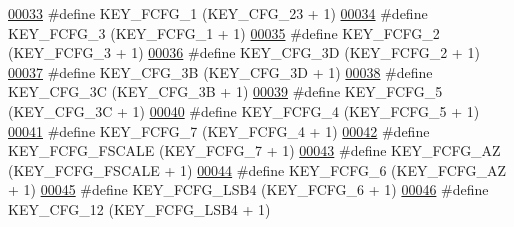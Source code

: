 \begin{DoxyCode}
\hypertarget{dmp_key_8h_source.tex_l00033}{}\hyperlink{dmp_key_8h_a9b1a7d7daa4fb73fb03dabaf6f4c97b9}{00033} \textcolor{preprocessor}{#define KEY\_FCFG\_1                  (KEY\_CFG\_23 + 1)}
\hypertarget{dmp_key_8h_source.tex_l00034}{}\hyperlink{dmp_key_8h_a2857c6fba1bb99df3e5f6da3e9b85a52}{00034} \textcolor{preprocessor}{#define KEY\_FCFG\_3                  (KEY\_FCFG\_1 + 1)}
\hypertarget{dmp_key_8h_source.tex_l00035}{}\hyperlink{dmp_key_8h_ac6bad3ac6c9d72158389154551e1bd45}{00035} \textcolor{preprocessor}{#define KEY\_FCFG\_2                  (KEY\_FCFG\_3 + 1)}
\hypertarget{dmp_key_8h_source.tex_l00036}{}\hyperlink{dmp_key_8h_a364597bae86eafc8fd74a851c1ad737c}{00036} \textcolor{preprocessor}{#define KEY\_CFG\_3D                  (KEY\_FCFG\_2 + 1)}
\hypertarget{dmp_key_8h_source.tex_l00037}{}\hyperlink{dmp_key_8h_a0e803abade5497b66f0f72a52dfa47b1}{00037} \textcolor{preprocessor}{#define KEY\_CFG\_3B                  (KEY\_CFG\_3D + 1)}
\hypertarget{dmp_key_8h_source.tex_l00038}{}\hyperlink{dmp_key_8h_af7e7b99c7694ffada093356f6f23dd0b}{00038} \textcolor{preprocessor}{#define KEY\_CFG\_3C                  (KEY\_CFG\_3B + 1)}
\hypertarget{dmp_key_8h_source.tex_l00039}{}\hyperlink{dmp_key_8h_a24055723a9605fc056840bfa4b3099e2}{00039} \textcolor{preprocessor}{#define KEY\_FCFG\_5                  (KEY\_CFG\_3C + 1)}
\hypertarget{dmp_key_8h_source.tex_l00040}{}\hyperlink{dmp_key_8h_af41ef0867f5403642cedca80fd269a69}{00040} \textcolor{preprocessor}{#define KEY\_FCFG\_4                  (KEY\_FCFG\_5 + 1)}
\hypertarget{dmp_key_8h_source.tex_l00041}{}\hyperlink{dmp_key_8h_adac5dd01ac0d30282f2346095867d09c}{00041} \textcolor{preprocessor}{#define KEY\_FCFG\_7                  (KEY\_FCFG\_4 + 1)}
\hypertarget{dmp_key_8h_source.tex_l00042}{}\hyperlink{dmp_key_8h_aa2d4b9ea9c8e0e82fa0cbde09c6c99d1}{00042} \textcolor{preprocessor}{#define KEY\_FCFG\_FSCALE             (KEY\_FCFG\_7 + 1)}
\hypertarget{dmp_key_8h_source.tex_l00043}{}\hyperlink{dmp_key_8h_a3c8c999449db24e646889bde950408a1}{00043} \textcolor{preprocessor}{#define KEY\_FCFG\_AZ                 (KEY\_FCFG\_FSCALE + 1)}
\hypertarget{dmp_key_8h_source.tex_l00044}{}\hyperlink{dmp_key_8h_a6d42a94e25bf38609e89a2259694f8db}{00044} \textcolor{preprocessor}{#define KEY\_FCFG\_6                  (KEY\_FCFG\_AZ + 1)}
\hypertarget{dmp_key_8h_source.tex_l00045}{}\hyperlink{dmp_key_8h_a2a8a7369e21b3e6446ac417a9f767e10}{00045} \textcolor{preprocessor}{#define KEY\_FCFG\_LSB4               (KEY\_FCFG\_6 + 1)}
\hypertarget{dmp_key_8h_source.tex_l00046}{}\hyperlink{dmp_key_8h_ab51fcfee1074d4d953ec3ea5bec99509}{00046} \textcolor{preprocessor}{#define KEY\_CFG\_12                  (KEY\_FCFG\_LSB4 + 1)}

\end{DoxyCode}
